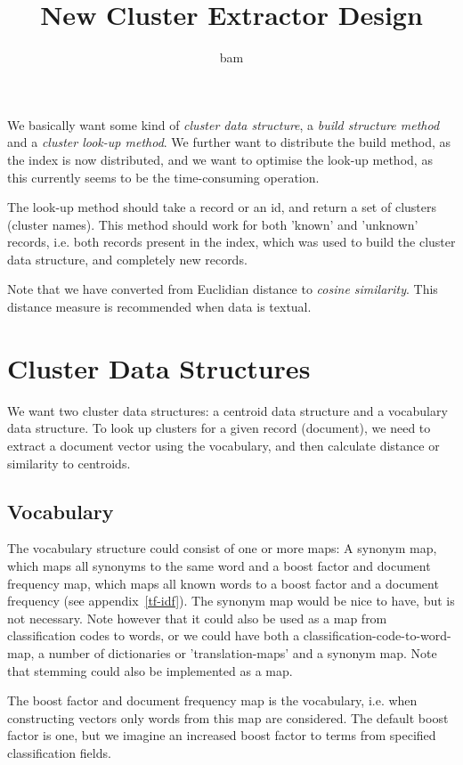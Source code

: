 \documentclass[a4paper,12pt]{article}
\title{New Cluster Extractor Design}
\author{bam}
\begin{document}
\maketitle


We basically want some kind of \emph{cluster data structure}, a
\emph{build structure method} and a \emph{cluster look-up method}. We
further want to distribute the build method, as the index is now
distributed, and we want to optimise the look-up method, as this
currently seems to be the time-consuming operation.

The look-up method should take a record or an id, and return a set of
clusters (cluster names). This method should work for both 'known' and
'unknown' records, i.e. both records present in the index, which was
used to build the cluster data structure, and completely new records.

Note that we have converted from Euclidian distance to \emph{cosine
similarity}. This distance measure is recommended when data is
textual.

\section{Cluster Data Structures}
\label{cluster-data-structures}

We want two cluster data structures: a centroid data structure and a
vocabulary data structure. To look up clusters for a given record
(document), we need to extract a document vector using the vocabulary,
and then calculate distance or similarity to centroids.

\subsection{Vocabulary}

The vocabulary structure could consist of one or more maps: A synonym
map, which maps all synonyms to the same word and a boost factor and
document frequency map, which maps all known words to a boost factor
and a document frequency (see appendix~\ref{tf-idf}). The synonym map
would be nice to have, but is not necessary. Note however that it
could also be used as a map from classification codes to words, or we
could have both a classification-code-to-word-map, a number of
dictionaries or 'translation-maps' and a synonym map. Note that
stemming could also be implemented as a map.

The boost factor and document frequency map is the vocabulary,
i.e. when constructing vectors only words from this map are
considered. The default boost factor is one, but we imagine an
increased boost factor to terms from specified classification fields.
\end{document}
